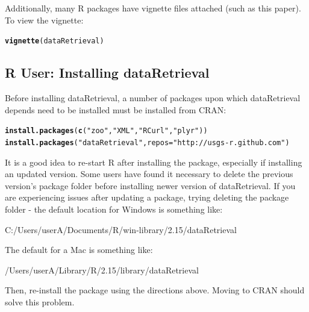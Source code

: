 \documentclass[a4paper,11pt]{article}\usepackage[]{graphicx}\usepackage[]{color}
\makeatletter
\newcommand{\hlstr}[1]{\textcolor[rgb]{0.192,0.494,0.8}{#1}}%
\newcommand{\hlstd}[1]{\textcolor[rgb]{0.345,0.345,0.345}{#1}}%
\newcommand{\hlkwc}[1]{\textcolor[rgb]{0.333,0.667,0.333}{#1}}%
\newcommand{\hlkwd}[1]{\textcolor[rgb]{0.737,0.353,0.396}{\textbf{#1}}}%
\newenvironment{kframe}{%
 \def\at@end@of@kframe{}%
 \ifinner\ifhmode%
  \def\at@end@of@kframe{\end{minipage}}%
  \begin{minipage}{\columnwidth}%
 \fi\fi%
 \def\FrameCommand##1{\hskip\@totalleftmargin \hskip-\fboxsep
 \colorbox{shadecolor}{##1}\hskip-\fboxsep
     \hskip-\linewidth \hskip-\@totalleftmargin \hskip\columnwidth}%
 \MakeFramed {\advance\hsize-\width
   \@totalleftmargin\z@ \linewidth\hsize
   \@setminipage}}%
 {\par\unskip\endMakeFramed%
 \at@end@of@kframe}
\newenvironment{knitrout}{}{} %
\makeatother
\begin{document}
Additionally, many R packages have vignette files attached (such as this paper). To view the vignette:
\begin{knitrout}
\color{fgcolor}\begin{kframe}
\begin{alltt}
\hlkwd{vignette}\hlstd{(dataRetrieval)}
\end{alltt}
\end{kframe}
\end{knitrout}


\FloatBarrier
\clearpage
\subsection{R User: Installing dataRetrieval}
Before installing dataRetrieval, a number of packages upon which dataRetrieval depends need to be installed must be installed from CRAN:

\begin{knitrout}
\color{fgcolor}\begin{kframe}
\begin{alltt}
\hlkwd{install.packages}\hlstd{(}\hlkwd{c}\hlstd{(}\hlstr{"zoo"}\hlstd{,}\hlstr{"XML"}\hlstd{,}\hlstr{"RCurl"}\hlstd{,}\hlstr{"plyr"}\hlstd{))}
\hlkwd{install.packages}\hlstd{(}\hlstr{"dataRetrieval"}\hlstd{,} \hlkwc{repos}\hlstd{=}\hlstr{"http://usgs-r.github.com"}\hlstd{)}
\end{alltt}
\end{kframe}
\end{knitrout}


It is a good idea to re-start R after installing the package, especially if installing an updated version. Some users have found it necessary to delete the previous version's package folder before installing newer version of dataRetrieval. If you are experiencing issues after updating a package, trying deleting the package folder - the default location for Windows is something like:

C:/Users/userA/Documents/R/win-library/2.15/dataRetrieval

The default for a Mac is something like:

/Users/userA/Library/R/2.15/library/dataRetrieval

Then, re-install the package using the directions above. Moving to CRAN should solve this problem.
\end{document}
